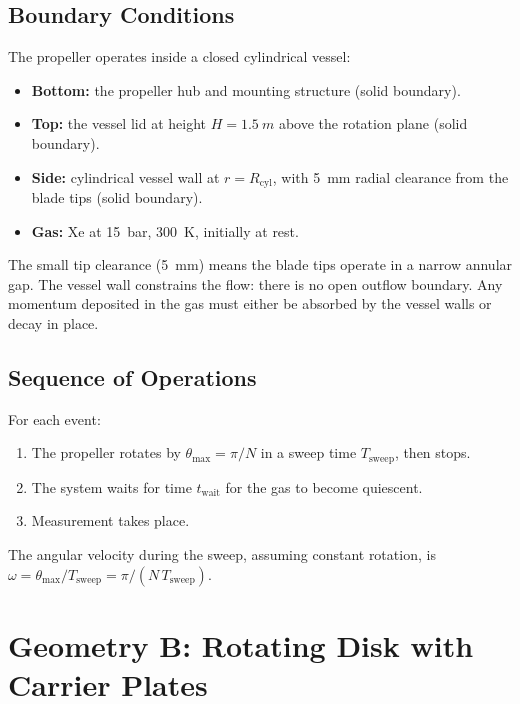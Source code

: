 \documentclass[11pt,a4paper]{article}
\begin{document}
\subsection{Boundary Conditions}

The propeller operates inside a closed cylindrical vessel:
\begin{itemize}
  \item \textbf{Bottom:} the propeller hub and mounting structure
        (solid boundary).
  \item \textbf{Top:} the vessel lid at height $H = \SI{1.5}{m}$
        above the rotation plane (solid boundary).
  \item \textbf{Side:} cylindrical vessel wall at $r = R_\mathrm{cyl}$,
        with \SI{5}{mm} radial clearance from the blade tips
        (solid boundary).
  \item \textbf{Gas:} Xe at \SI{15}{bar}, \SI{300}{K}, initially at
        rest.
\end{itemize}

The small tip clearance (\SI{5}{mm}) means the blade tips operate in a
narrow annular gap. The vessel wall constrains the flow: there is no
open outflow boundary. Any momentum deposited in the gas must either
be absorbed by the vessel walls or decay in place.

\subsection{Sequence of Operations}

For each event:
\begin{enumerate}
  \item The propeller rotates by $\theta_\mathrm{max} = \pi/N$ in a
        sweep time $T_\mathrm{sweep}$, then stops.
  \item The system waits for time $t_\mathrm{wait}$ for the gas to
        become quiescent.
  \item Measurement takes place.
\end{enumerate}

The angular velocity during the sweep, assuming constant rotation, is
$\omega = \theta_\mathrm{max} / T_\mathrm{sweep} = \pi / (N\,
T_\mathrm{sweep})$.


\section{Geometry B: Rotating Disk with Carrier Plates}
\label{sec:disk}
\end{document}
